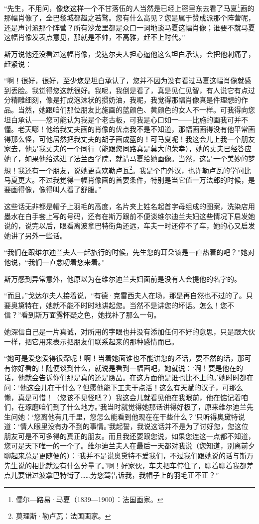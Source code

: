 \par “先生，不用问，像您这样一个不甘落伍的人当然是已经上密里东去看了马夏\footnote{儒尔—路易·马夏（1839—1900）：法国画家。}画的那幅肖像了，全巴黎城都趋之若鹜。您有什么高见？您是属于赞成派那个阵营呢，还是声讨派那个阵营？所有沙龙里都是众口一词地谈马夏这幅肖像；谁要不就马夏这幅肖像发表点意见，那就是不帅，不高雅，赶不上时代。”
\par 斯万说他还没看过这幅肖像，戈达尔夫人担心逼他这么坦白承认，会把他刺痛了，赶紧说：
\par “啊！很好，很好，至少您是坦白承认了，您并不因为没有看过马夏这幅肖像就感到丢脸。我觉得您这就很好。我呢，我倒是看了，真是见仁见智，有人说它有点过分精雕细刻，像是打成泡沫状的掼奶油，我呢，我觉得那幅肖像真是件理想的作品。当然，她跟咱们那位朋友比施画的蓝颜色、黄颜色的女人不一样。可我得向您坦白承认——您可能认为我是个老古板，可我是心口如一——比施的画我可并不懂。老天哪！他给我丈夫画的肖像的优点我不是不知道，那幅画画得没有他平常画得那么怪，可他居然把我丈夫的胡子画成蓝的！可马夏呢！我这会儿上我一个朋友家去，他是我丈夫的一个同行（能跟您同路真是莫大的荣幸），她的丈夫已经答应她了，如果他给选进了法兰西学院，就请马夏给她画像。当然，这是一个美妙的梦想！我还有一个朋友，说她更喜欢勒卢瓦\footnote{莫理斯·勒卢瓦：法国画家。}。我是个门外汉，也许勒卢瓦的学问比马夏更大。不过我觉得一幅肖像画的首要条件，特别是当它值一万法郎的时候，是要画得像，像得叫人看了舒服。”
\par 这些话无非都是帽子上羽毛的高度，名片夹上姓名起首字母组成的图案，洗染店用墨水在白手套上写的号码，还有在斯万跟前不便谈维尔迪兰夫妇这些情况下启发她说的，说完以后，眼看离波拿巴特街角还远，车夫一时还停不了车，她的心又启发她讲了另外一些话。
\par “我们在跟维尔迪兰夫人一起旅行的时候，先生您的耳朵该是一直热着的吧？”她对他说，“我们一直念叨着您来着。”
\par 斯万感到异常意外，他原以为在维尔迪兰夫妇面前是没有人会提他的名字的。
\par “而且，”戈达尔夫人接着说，“有德·克雷西夫人在场，那是再自然也不过的了。只要奥黛特在，她就不能不时时地讲起您。当然不是讲您的坏话。怎么！您不信？”看到斯万面露怀疑之色，她找补了那么一句。
\par 她深信自己是一片真诚，对所用的字眼也并没有添加任何不好的意思，只是跟大伙一样，把它用来表示把朋友们联系起来的那种感情而已。
\par “她可是爱您爱得很深呢！啊！当着她面谁也不能讲您的坏话，要不然的话，那可有你好看的！随便谈到什么，就说是看到一幅画吧，她就说：‘啊！要是他在的话，他就会告诉你们那是真的还是赝品。在这方面他是谁也比不上的。’她时时都在问：‘他这会儿在干什么？但愿他能下工夫干点活！这么有天赋的汉子，可那么懒，真是可惜！（您该不见怪吧？）我这会儿就看见他在我眼前，他在惦记着咱们，在琢磨咱们到了什么地方。’我当时就觉得她那话讲得好极了，原来维尔迪兰先生问她：‘您离他有几千里，您怎么能看到他现在在干些什么？’只听得奥黛特说道：‘情人眼里没有办不到的事情。’我起誓，我说这话并不是为了讨好您，您这位朋友可是不可多得的真正的朋友。而且我还要跟您说，如果您连这一点都不知道，您可是天下唯一的一个了。维尔迪兰夫人在最后一天都对我说（您知道，别离前夕聊起来总是更随便的）：‘我并不是说奥黛特不爱我们，不过我们跟她说的话与斯万先生说的相比就没有什么分量了。’啊！好家伙，车夫把车停住了，聊着聊着我都差点儿要错过波拿巴特街了……劳您驾告诉我，我帽子上的羽毛正不正？”
